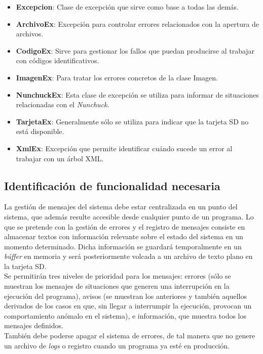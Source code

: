 \begin{itemize}
\item \textbf{Excepcion}: Clase de excepción que sirve como base a todas las demás.
\item \textbf{ArchivoEx}: Excepción para controlar errores relacionados con la apertura de archivos.
\item \textbf{CodigoEx}: Sirve para gestionar los fallos que puedan producirse al trabajar con códigos identificativos.
\item \textbf{ImagenEx}: Para tratar los errores concretos de la clase Imagen.
\item \textbf{NunchuckEx}: Esta clase de excepción se utiliza para informar de situaciones relacionadas con el \emph{Nunchuck}.
\item \textbf{TarjetaEx}: Generalmente sólo se utiliza para indicar que la tarjeta SD no está disponible.
\item \textbf{XmlEx}: Excepción que permite identificar cuándo sucede un error al trabajar con un árbol XML.
\end{itemize}

\subsection{Identificación de funcionalidad necesaria}

La gestión de mensajes del sistema debe estar centralizada en un punto del sistema, que además resulte accesible desde cualquier punto de un programa. Lo que se pretende con la gestión de errores y el registro de mensajes consiste en almacenar textos con información relevante sobre el estado del sistema en un momento determinado. Dicha información se guardará temporalmente en un \emph{búffer} en memoria y será posteriormente volcada a un archivo de texto plano en la tarjeta SD.\\

Se permitirán tres niveles de prioridad para los mensajes: errores (sólo se muestran los mensajes de situaciones que generen una interrupción en la ejecución del programa), avisos (se muestran los anteriores y también aquellos derivados de los casos en que, sin llegar a interrumpir la ejecución, provocan un comportamiento anómalo en el sistema), e información, que muestra todos los mensajes definidos.\\

También debe poderse apagar el sistema de errores, de tal manera que no genere un archivo de \emph{logs} o registro cuando un programa ya esté en producción.

